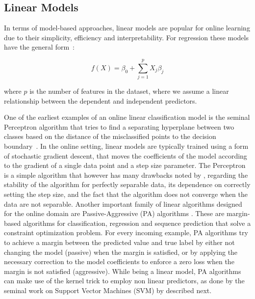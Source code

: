 \subsection*{Linear Models}
In terms of model-based approaches, linear models are popular
for online learning due to their simplicity, efficiency and interpretability.
For regression these models have the general form~\cite{esl}:

\begin{equation}
	f(X) = \beta_0 + \sum_{j=1}^{p}{X_j\beta_j}
\end{equation}

\noindent
where $p$ is the number of features in the dataset, where we assume a linear relationship between the dependent and independent predictors.

One of the earliest examples of an online linear classification model is the seminal
Perceptron algorithm \cite{perceptron} that tries to find a separating hyperplane
between two classes based on the distance of the misclassified points to the
decision boundary~\cite{esl}.
In the online setting, linear models are typically trained using a form
of stochastic gradient descent, that moves the coefficients
of the model according to the gradient of a single data point
and a step size parameter.
The Perceptron is a simple algorithm that however has many drawbacks
noted by \citet{esl}, regarding the stability of the algorithm
for perfectly separable data, its dependence on correctly setting
the step size, and the fact that the algorithm does not
converge when the data are not separable.
Another important family of linear algorithms designed for the online domain
are Passive-Aggressive (PA) algorithms \cite{passive-aggressive}.
These are margin-based algorithms for classification, regression and
sequence prediction that solve a constraint optimization problem.
For every incoming example, PA algorithms
try to achieve a margin between the predicted value and true label
by either not changing the model (passive) when the margin is satisfied,
or by applying the necessary correction to the model coefficients
to enforce a zero loss when the margin is not satisfied (aggressive).
While being a linear model, PA algorithms can make use of the kernel trick to
employ non linear predictors, as done by the seminal work
on Support Vector Machines (SVM) by \citet{svm-book} described next.

